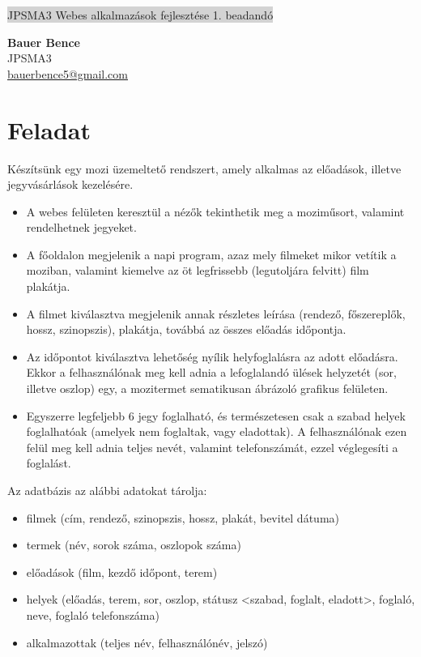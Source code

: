 \documentclass[11pt,a4paper]{article}
\begin{document}
\renewcommand{\labelitemi}{\textbullet}
\def\br{\\[0.1cm]}
\thispagestyle{empty}
\begin{center}
	\colorbox{lightgray}{{\large JPSMA3} \hspace{3cm} {\large Webes alkalmazások fejlesztése 1. beadandó} \hspace{5cm} \thepage}
\end{center}
\begin{framed}
	\begin{flushleft}
		{\large \textbf{Bauer Bence}}
		\hspace{5.4cm}{\large 2019.03.13.}\br
		{\large JPSMA3}\br
		{\large \href{mailto:bauerbence5@gmail.com}{bauerbence5@gmail.com}}
	\end{flushleft}
\end{framed}
\section{Feladat}

Készítsünk egy mozi üzemeltető rendszert, amely alkalmas az előadások, illetve
jegyvásárlások kezelésére.
\begin{itemize}
	\item A webes felületen keresztül a nézők tekinthetik meg a moziműsort,
	valamint rendelhetnek jegyeket.
	\item A főoldalon megjelenik a napi program, azaz mely filmeket mikor
	vetítik a moziban, valamint kiemelve az öt legfrissebb (legutoljára
	felvitt) film plakátja.
	\item A filmet kiválasztva megjelenik annak részletes leírása (rendező,
	főszereplők, hossz, szinopszis), plakátja, továbbá az összes előadás
	időpontja.
	\item Az időpontot kiválasztva lehetőség nyílik helyfoglalásra az
	adott előadásra.
	Ekkor a felhasználónak meg kell adnia a lefoglalandó ülések helyzetét (sor,
	illetve oszlop) egy, a mozitermet sematikusan ábrázoló grafikus felületen.
	\item Egyszerre legfeljebb 6 jegy foglalható, és természetesen csak a
	szabad helyek foglalhatóak (amelyek nem foglaltak, vagy eladottak).
	A felhasználónak ezen felül meg kell adnia teljes nevét, valamint
	telefonszámát, ezzel véglegesíti a foglalást.
\end{itemize}
Az adatbázis az alábbi adatokat tárolja:
\begin{itemize}
	\item filmek (cím, rendező, szinopszis, hossz, plakát, bevitel dátuma)
	\item termek (név, sorok száma, oszlopok száma)
	\item előadások (film, kezdő időpont, terem)
	\item helyek (előadás, terem, sor, oszlop, státusz
	<szabad, foglalt, eladott>, foglaló, neve, foglaló telefonszáma)
	\item alkalmazottak (teljes név, felhasználónév, jelszó)
\end{itemize}
\end{document}
